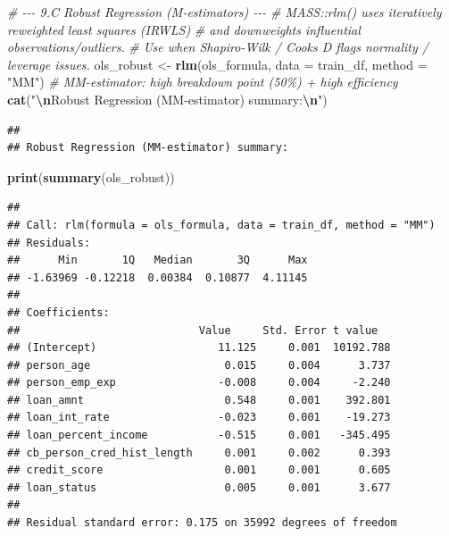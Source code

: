 \documentclass[
]{article}
\newenvironment{Shaded}{\begin{snugshade}}{\end{snugshade}}
\newcommand{\AttributeTok}[1]{\textcolor[rgb]{0.13,0.29,0.53}{#1}}
\newcommand{\CommentTok}[1]{\textcolor[rgb]{0.56,0.35,0.01}{\textit{#1}}}
\newcommand{\FunctionTok}[1]{\textcolor[rgb]{0.13,0.29,0.53}{\textbf{#1}}}
\newcommand{\NormalTok}[1]{#1}
\newcommand{\OtherTok}[1]{\textcolor[rgb]{0.56,0.35,0.01}{#1}}
\newcommand{\SpecialCharTok}[1]{\textcolor[rgb]{0.81,0.36,0.00}{\textbf{#1}}}
\newcommand{\StringTok}[1]{\textcolor[rgb]{0.31,0.60,0.02}{#1}}
\begin{document}
\begin{Shaded}
\begin{Highlighting}[]
\CommentTok{\# {-}{-}{-} 9.C  Robust Regression (M{-}estimators) {-}{-}{-}}
\CommentTok{\# MASS::rlm() uses iteratively reweighted least squares (IRWLS)}
\CommentTok{\# and downweights influential observations/outliers.}
\CommentTok{\# Use when Shapiro{-}Wilk / Cook\textquotesingle{}s D flags normality / leverage issues.}
\NormalTok{ols\_robust }\OtherTok{\textless{}{-}} \FunctionTok{rlm}\NormalTok{(ols\_formula, }\AttributeTok{data =}\NormalTok{ train\_df, }\AttributeTok{method =} \StringTok{"MM"}\NormalTok{)}
                  \CommentTok{\# MM{-}estimator: high breakdown point (50\%) + high efficiency}
\FunctionTok{cat}\NormalTok{(}\StringTok{"}\SpecialCharTok{\textbackslash{}n}\StringTok{Robust Regression (MM{-}estimator) summary:}\SpecialCharTok{\textbackslash{}n}\StringTok{"}\NormalTok{)}
\end{Highlighting}
\end{Shaded}

\begin{verbatim}
## 
## Robust Regression (MM-estimator) summary:
\end{verbatim}

\begin{Shaded}
\begin{Highlighting}[]
\FunctionTok{print}\NormalTok{(}\FunctionTok{summary}\NormalTok{(ols\_robust))}
\end{Highlighting}
\end{Shaded}

\begin{verbatim}
## 
## Call: rlm(formula = ols_formula, data = train_df, method = "MM")
## Residuals:
##      Min       1Q   Median       3Q      Max 
## -1.63969 -0.12218  0.00384  0.10877  4.11145 
## 
## Coefficients:
##                            Value     Std. Error t value  
## (Intercept)                   11.125     0.001  10192.788
## person_age                     0.015     0.004      3.737
## person_emp_exp                -0.008     0.004     -2.240
## loan_amnt                      0.548     0.001    392.801
## loan_int_rate                 -0.023     0.001    -19.273
## loan_percent_income           -0.515     0.001   -345.495
## cb_person_cred_hist_length     0.001     0.002      0.393
## credit_score                   0.001     0.001      0.605
## loan_status                    0.005     0.001      3.677
## 
## Residual standard error: 0.175 on 35992 degrees of freedom
\end{verbatim}
\end{document}

